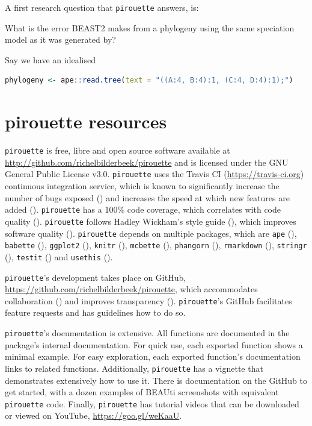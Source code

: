 \documentclass{article}
\begin{document}
A first research question that \verb;pirouette; answers, is:

What is the error BEAST2 makes from a phylogeny using the same 
speciation model as it was generated by?

Say we have an idealised

\begin{lstlisting}[language=R, floatplacement=H]
phylogeny <- ape::read.tree(text = "((A:4, B:4):1, (C:4, D:4):1);")
\end{lstlisting}



\section{pirouette resources}

\verb;pirouette; is free, libre and open source software available at 
\url{http://github.com/richelbilderbeek/pirouette}
and is licensed under the GNU General Public License v3.0.
\verb;pirouette; uses the Travis CI (\url{https://travis-ci.org})
continuous integration service, which is known to significantly 
increase the number of bugs exposed (\cite{vasilescu2015}) and increases
the speed at which new features are added (\cite{vasilescu2015}).
\verb;pirouette; has a 100\% code coverage, which correlates with 
code quality (\cite{horgan1994,del1995correlation}). 
\verb;pirouette; follows Hadley Wickham's style guide (\cite{style_guide}), 
which improves software quality (\cite{fang2001}).
\verb;pirouette; depends on multiple packages, which are 
\verb;ape; (\cite{APE}), 
\verb;babette; (\cite{bilderbeek2018babette}),
\verb;ggplot2; (\cite{ggplot2}),
\verb;knitr; (\cite{knitr}),
\verb;mcbette; (\cite{mcbette}),
\verb;phangorn; (\cite{phangorn}),
\verb;rmarkdown; (\cite{rmarkdown}),
\verb;stringr; (\cite{stringr}),
\verb;testit; (\cite{testit}) and 
\verb;usethis; (\cite{usethis}).

\verb;pirouette;'s development takes place on GitHub,
\url{https://github.com/richelbilderbeek/pirouette}, 
which accommodates collaboration (\cite{perez2016ten}) 
and improves transparency (\cite{gorgolewski2016practical}).
\verb;pirouette;'s GitHub facilitates feature requests and 
has guidelines how to do so.

\verb;pirouette;'s documentation is extensive. All functions are documented
in the package's internal documentation. For quick use, 
each exported function shows a minimal example. 
For easy exploration, each exported function's documentation links to related functions.
Additionally, \verb;pirouette; has a vignette that demonstrates extensively how
to use it. There is documentation on the GitHub to get started, 
with a dozen examples of BEAUti screenshots with equivalent \verb;pirouette; code.
Finally, \verb;pirouette; has tutorial videos that can 
be downloaded or viewed on YouTube, \url{https://goo.gl/weKaaU}.
\end{document}
